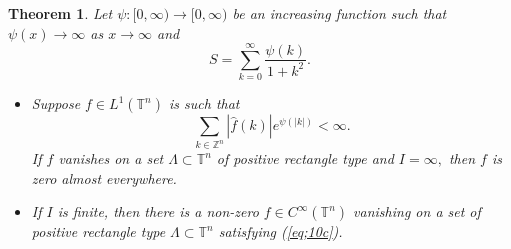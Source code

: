 \documentclass [11pt]{amsart}
\newtheorem{Thm}{Theorem}[section]
\newcommand{\T}{\mathbb T}
\newcommand{\Z}{\mathbb Z}
\newcommand{\ra} {\rightarrow}
\numberwithin{equation}{section}
\begin{document}
\begin{Thm}\label{sev-fn-c}
Let $\psi:[0,\infty)\to [0,\infty)$ be an increasing function such that $\psi(x) \ra \infty$ as $          x \ra \infty$ and 
\begin{equation*}
S = \sum_{k=0}^\infty\dfrac{\psi(k)}{1+k^2}.
\end{equation*}
\begin{itemize}
\item[(a)] Suppose $f\in L^1(\T^n)$ is such that 
\begin{equation}\label{eq;10c}
\sum_{k\in\Z^n}|\widehat{f}(k)|e^{\psi(|k|)}<\infty .
\end{equation}
If $f$ vanishes on a set $\Lambda \subset \T^n$ of positive rectangle type and $I = \infty,$ then $f$ is zero almost everywhere.
\item[(b)] If $I$ is finite, then there is a non-zero $f\in C^\infty(\T^n)$ vanishing on a set of positive rectangle type $\Lambda \subset \T^n$ satisfying (\ref{eq;10c}).
\end{itemize}
\end{Thm}
\end{document}
